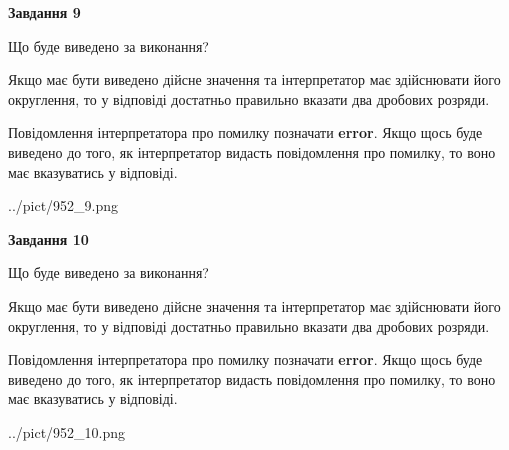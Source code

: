 \documentclass[12pt, ukrainian]{article}
\begin{document}
{\begin {Large}
{\begin {center}\textbf{Завдання 9}\end {center}}\par
Що буде виведено за виконання? \par

Якщо має бути виведено дійсне значення та інтерпретатор має здійснювати його округлення, 
то у відповіді достатньо правильно вказати два дробових розряди.

Повідомлення інтерпретатора про помилку позначати \textbf{error}.
Якщо щось буде виведено до того, як інтерпретатор видасть повідомлення про помилку, 
то воно має вказуватись у відповіді. \par

\begin{center}
	{../pict/952_9.png}
\end{center}
\newpage

{\begin {center}\textbf{Завдання 10}\end {center}}\par
Що буде виведено за виконання? \par

Якщо має бути виведено дійсне значення та інтерпретатор має здійснювати його округлення, 
то у відповіді достатньо правильно вказати два дробових розряди.

Повідомлення інтерпретатора про помилку позначати \textbf{error}.
Якщо щось буде виведено до того, як інтерпретатор видасть повідомлення про помилку, 
то воно має вказуватись у відповіді. \par

\begin{center}
	{../pict/952_10.png}
\end{center}
\newpage

\end {Large}}
\end{document}
